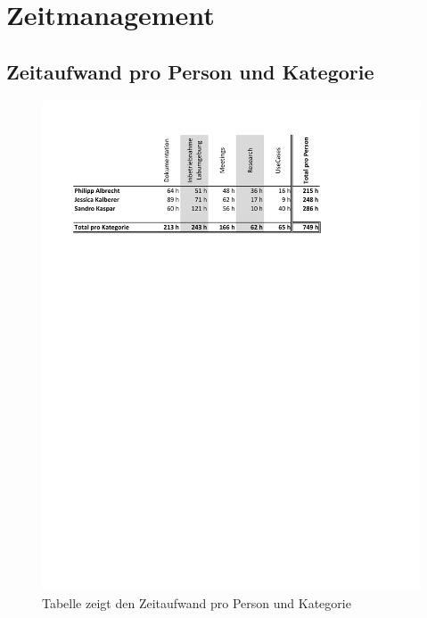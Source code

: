 \section{Zeitmanagement}

\subsection{Zeitaufwand pro Person und Kategorie}
\begin{figure}[H]
	\centering
	\includegraphics[]{img/zeitaufwand/zeitaufwand_pro_person.pdf}
	\caption{Tabelle zeigt den Zeitaufwand pro Person und Kategorie}	\label{fig:zeitmanagement-person-kategorie}
\end{figure} 

